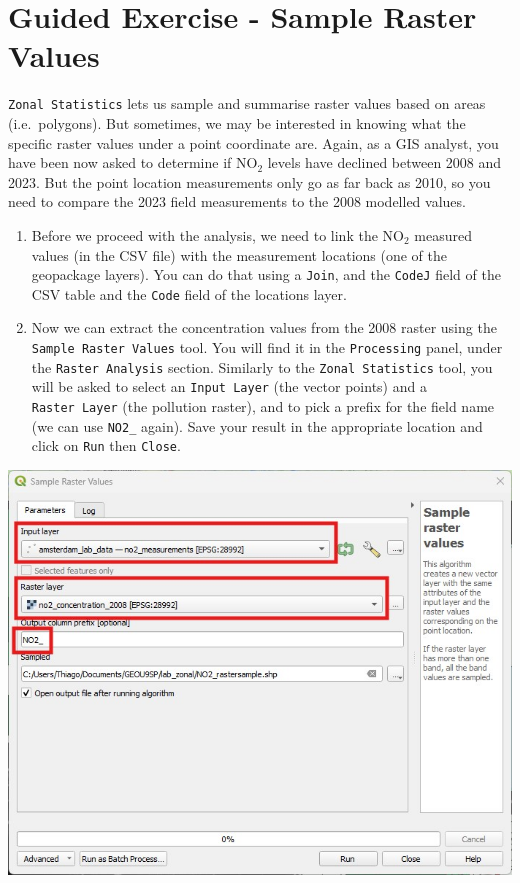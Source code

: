 \documentclass[
  letterpaper,
  DIV=11,
  numbers=noendperiod]{scrreprt}
\begin{document}
\section{Guided Exercise - Sample Raster
Values}\label{guided-exercise---sample-raster-values}

\texttt{Zonal\ Statistics} lets us sample and summarise raster values
based on areas (i.e.~polygons). But sometimes, we may be interested in
knowing what the specific raster values under a point coordinate are.
Again, as a GIS analyst, you have been now asked to determine if
NO\(_2\) levels have declined between 2008 and 2023. But the point
location measurements only go as far back as 2010, so you need to
compare the 2023 field measurements to the 2008 modelled values.

\begin{enumerate}
\def\labelenumi{(\arabic{enumi})}
\setcounter{enumi}{325}
\item
  Before we proceed with the analysis, we need to link the NO\(_2\)
  measured values (in the CSV file) with the measurement locations (one
  of the geopackage layers). You can do that using a \texttt{Join}, and
  the \texttt{CodeJ} field of the CSV table and the \texttt{Code} field
  of the locations layer.
\item
  Now we can extract the concentration values from the 2008 raster using
  the \texttt{Sample\ Raster\ Values} tool. You will find it in the
  \texttt{Processing} panel, under the \texttt{Raster\ Analysis}
  section. Similarly to the \texttt{Zonal\ Statistics} tool, you will be
  asked to select an \texttt{Input\ Layer} (the vector points) and a
  \texttt{Raster\ Layer} (the pollution raster), and to pick a prefix
  for the field name (we can use \texttt{NO2\_} again). Save your result
  in the appropriate location and click on \texttt{Run} then
  \texttt{Close}.
\end{enumerate}

\includegraphics{images/lab_12/lab12_fig3_sampleraster.jpg}
\end{document}
